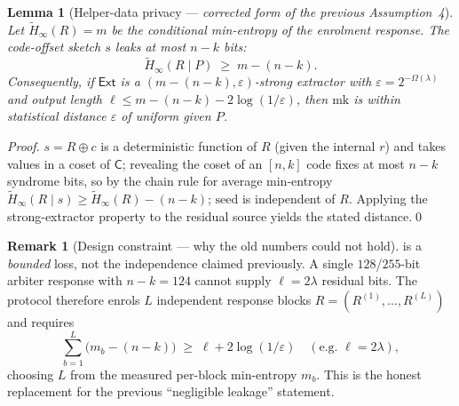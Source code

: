 \documentclass[11pt]{article}
\theoremstyle{plain}
\newtheorem{lemma}[theorem]{Lemma}
\theoremstyle{definition}
\newtheorem{remark}{Remark}
\newcommand{\mk}{\mathrm{mk}}
\newcommand{\Ext}{\mathsf{Ext}}
\newcommand{\Code}{\mathsf{C}}
\newcommand{\secpar}{\lambda}
\newcommand{\entropy}{\widetilde{H}_\infty}
\newcommand{\xor}{\oplus}
\begin{document}
\begin{lemma}[Helper-data privacy --- \emph{corrected form of the previous
Assumption~4}]\label{lem:fe}
Let $\entropy(R)=m$ be the conditional min-entropy of the enrolment
response. The code-offset sketch $s$ leaks \emph{at most} $n-k$ bits:
\begin{equation}
\entropy\!\left(R \mid P\right)\;\ge\; m-(n-k).
\label{eq:leak}
\end{equation}
Consequently, if $\Ext$ is a $(m-(n-k),\varepsilon)$-strong extractor with
$\varepsilon=2^{-\Omega(\secpar)}$ and output length
$\ell\le m-(n-k)-2\log(1/\varepsilon)$, then $\mk$ is within statistical
distance $\varepsilon$ of uniform given $P$.
\end{lemma}
\begin{proof}
$s=R\xor c$ is a deterministic function of $R$ (given the internal $r$) and
takes values in a coset of $\Code$; revealing the coset of an $[n,k]$ code
fixes at most $n-k$ syndrome bits, so by the chain rule for average
min-entropy $\entropy(R\mid s)\ge \entropy(R)-(n-k)$; $\text{seed}$ is
independent of $R$. Applying the strong-extractor property to the residual
source yields the stated distance.\qed
\end{proof}

\begin{remark}[Design constraint --- why the old numbers could not hold]
 is a \emph{bounded} loss, not the independence claimed
previously. A single $128$/$255$-bit arbiter response with $n-k=124$ cannot
supply $\ell=2\secpar$ residual bits. The protocol therefore enrols
$L$ independent response blocks $R=(R^{(1)},\dots,R^{(L)})$ and requires
\begin{equation}
\textstyle\sum_{b=1}^{L}\bigl(m_b-(n-k)\bigr)\;\ge\;\ell+2\log(1/\varepsilon)
\quad(\text{e.g. }\ell=2\secpar),
\label{eq:design}
\end{equation}
choosing $L$ from the measured per-block min-entropy $m_b$. This is the
honest replacement for the previous ``negligible leakage'' statement.
\end{remark}
\end{document}
